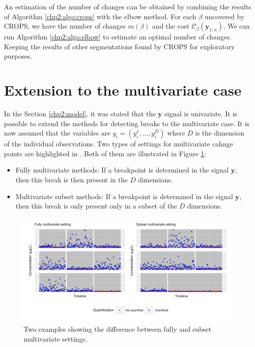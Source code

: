 An estimation of the number of changes can be obtained by combining the results of Algorithm  \ref{chp2:algo:crops} with the elbow method. For each $\beta$ uncovered by CROPS, we have the number of changes $m(\beta)$ and the cost $\mathcal{C}_{\beta}(\bm y_{1:n})$. We can run Algorithm \ref{chp2:algo:elbow} to estimate an optimal number of changes. Keeping the results of other segmentations found by CROPS for exploratory purposes. 

\section{Extension to the multivariate case}

In the Section \ref{chp2:model}, it was stated that the $\bm y$ signal is univariate. It is possible to extend the methods for detecting breaks to the multivariate case. It is now assumed that the variables are $y_i = (y_i^1,...,y_i^D)$ where $D$ is the dimension of the individual observations. Two types of settings for multivariate cahnge points are highlighted in \cite{pickering2016changepoint}. Both of them are illustrated in Figure \ref{fig:multicp}:

\begin{itemize}
  \item Fully multivariate methods: If a breakpoint is determined in the signal $\bm y$, then this break is then present in the $D$ dimensions. 
  \item Multivariate subset methods: If a breakpoint is determined in the signal $\bm y$, then this break is only present only in a subset of the $D$ dimensions.
\end{itemize}

\begin{figure}[ht]
  \centering
  \includegraphics[]{figs/Chap2/MultiCP.pdf}
  \caption{Two examples showing the difference between fully and subset multivariate settings.}
  \label{fig:multicp}
\end{figure}


